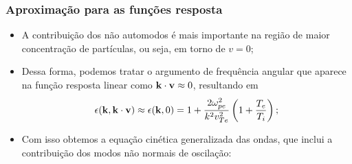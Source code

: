 \documentclass[10pt,aspectratio=1610,lualatex]{beamer}
\begin{document}
\begin{frame}
  \frametitle{Aproximação para as funções resposta}
  \begin{itemize}
    \item A contribuição dos não automodos é mais importante na região
    de maior concentração de partículas, ou seja,  em torno de $v=0$;
    \vspace{0.2cm}
    \item Dessa forma, podemos tratar o argumento de frequência angular
    que aparece na função resposta linear como ${\bf k \cdot v}\approx 0$,
    resultando em
    \begin{displaymath}
      \epsilon({\bf k},{\bf k \cdot v})\approx
      \epsilon({\bf k},0)=1
      +\frac{2 \omega_{pe}^2}{k^2v_{Te}^2}\left( 1+\frac{T_e}{T_i} \right);
    \end{displaymath}\vspace{-0.4cm}
    \pause
    \item Com isso obtemos a equação cinética generalizada das
    ondas, que inclui a contribuição dos modos não normais de
    oscilação:
  \end{itemize}
\end{frame}
\end{document}
